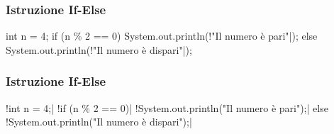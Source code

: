 \begin{frame}[fragile]\frametitle{Istruzione If-Else}

  \begin{JavaCodePlain}[commandchars=\\!|]
    int n = 4;
    if (n \% 2 == 0) {
      System.out.println(\String!"Il numero è pari"|);
    } else {
      System.out.println(\String!"Il numero è dispari"|);
    }
  \end{JavaCodePlain}

\end{frame}


% 


\begin{frame}[fragile]\frametitle{Istruzione If-Else}
  \begin{JavaCodePlain}[commandchars=\\!|]
    \Blue!int n = 4;|
    \Green!if (n \% 2 == 0)| {
      \Red!System.out.println("Il numero è pari");|
    } else {
      \Red!System.out.println("Il numero è dispari");|
    }
  \end{JavaCodePlain}
\end{frame}

